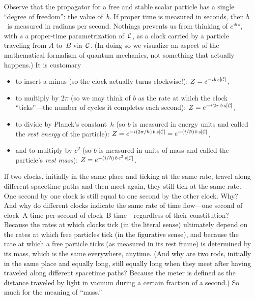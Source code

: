 \documentclass[12pt]{article}
\newcommand{\bi}{\begin{itemize}}
\newcommand{\ei}{\end{itemize}}
\newcommand{\cC}{{\cal C}}
\begin{document}
Observe that the propagator for a free and stable scalar particle has a single ``degree of freedom'': the value of~$b$.  If proper time is measured in seconds, then $b$~is measured in radians per second. Nothings prevents us from thinking of $e^{ib\,s}$, with $s$ a proper-time parametrization of~$\cC$, as a clock carried by a particle traveling from $A$ to~$B$ via~$\cC$. (In doing so we visualize an aspect of the mathematical formalism of quantum mechanics, not something that actually happens.) It is customary
\bi
\item to insert a minus (so the clock actually turns clockwise!): $Z=e^{-ib\,s[\cC]}$,
\item to multiply by $2\pi$ (so we may think of $b$ as the rate at which the clock ``ticks''---the number of cycles it completes each second): $Z=e^{-i\,2\pi\,b\,s[\cC]}$,
\item to divide by Planck's constant~$h$ (so $b$ is measured in energy units and called the {\it rest energy\/} of the particle): $Z=e^{-i(2\pi/h)\,b\,s[\cC]}=e^{-(i/\hbar)\,b\,s[\cC]}$,
\item and to multiply by $c^2$ (so $b$ is measured in units of mass and called the particle's \textit{rest mass}): $Z=e^{-(i/\hbar)\,b\,c^2\,s[\cC]}$.
\ei
If two clocks, initially in the same place and ticking at the same rate, travel along different spacetime paths and then meet again, they still tick at the same rate. One second by one clock is still equal to one second by the other clock. Why? And why do different clocks indicate the same rate of time flow---one second of clock~A time per second of clock~B time---regardless of their constitution? Because the rates at which clocks tick (in the literal sense) ultimately depend on the rates at which free particles tick (in the figurative sense), and because the rate at which a free particle ticks (as measured in its rest frame) is determined by its mass, which is the same everywhere, anytime. (And why are two rods, initially in the same place and equally long, still equally long when they meet after having traveled along different spacetime paths? Because the meter is defined as the distance traveled by light in vacuum during a certain fraction of a second.) So much for the meaning of ``mass.''

\end{document}
